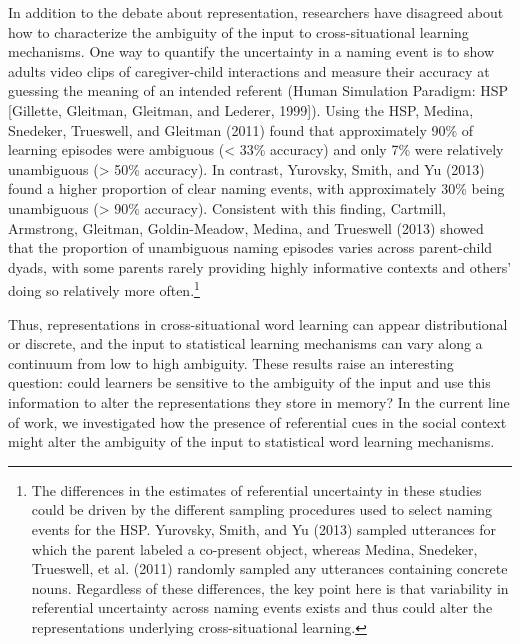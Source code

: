 \documentclass[oneside]{report}
\begin{document}
In addition to the debate about representation, researchers have
disagreed about how to characterize the ambiguity of the input to
cross-situational learning mechanisms. One way to quantify the
uncertainty in a naming event is to show adults video clips of
caregiver-child interactions and measure their accuracy at guessing the
meaning of an intended referent (Human Simulation Paradigm: HSP
{[}Gillette, Gleitman, Gleitman, and Lederer, 1999{]}). Using the HSP,
Medina, Snedeker, Trueswell, and Gleitman (2011) found that
approximately 90\% of learning episodes were ambiguous (\textless{} 33\%
accuracy) and only 7\% were relatively unambiguous (\textgreater{} 50\%
accuracy). In contrast, Yurovsky, Smith, and Yu (2013) found a higher
proportion of clear naming events, with approximately 30\% being
unambiguous (\textgreater{} 90\% accuracy). Consistent with this
finding, Cartmill, Armstrong, Gleitman, Goldin-Meadow, Medina, and
Trueswell (2013) showed that the proportion of unambiguous naming
episodes varies across parent-child dyads, with some parents rarely
providing highly informative contexts and others' doing so relatively
more often.\footnote{The differences in the estimates of referential
  uncertainty in these studies could be driven by the different sampling
  procedures used to select naming events for the HSP. Yurovsky, Smith,
  and Yu (2013) sampled utterances for which the parent labeled a
  co-present object, whereas Medina, Snedeker, Trueswell, et al. (2011)
  randomly sampled any utterances containing concrete nouns. Regardless
  of these differences, the key point here is that variability in
  referential uncertainty across naming events exists and thus could
  alter the representations underlying cross-situational learning.}

Thus, representations in cross-situational word learning can appear
distributional or discrete, and the input to statistical learning
mechanisms can vary along a continuum from low to high ambiguity. These
results raise an interesting question: could learners be sensitive to
the ambiguity of the input and use this information to alter the
representations they store in memory? In the current line of work, we
investigated how the presence of referential cues in the social context
might alter the ambiguity of the input to statistical word learning
mechanisms.
\end{document}
